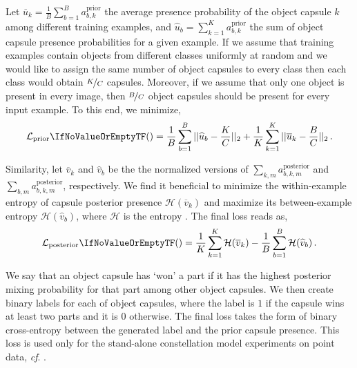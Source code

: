 \begin{description}[leftmargin=\parindent]
\item[Prior sparsity]
    Let $\overline{u}_k = \frac{1}{B} \sum_{b=1}^B a^\mathrm{prior}_{b,k}$ the average presence probability of the object capsule $k$ among different training examples, and $\widehat{u}_b = \sum_{k=1}^K a^\mathrm{prior}_{b,k}$ the sum of object capsule presence probabilities for a given example.
    If we assume that training examples contain objects from different classes uniformly at random and we would like to assign the same number of object capsules to every class then each class would obtain $\nicefrac{K}{C}$ capsules.
    Moreover, if we assume that only one object is present in every image, then $\nicefrac{B}{C}$ object capsules should be present for every input example.
    To this end, we minimize,
    \vspace*{-1.25em}
    \begin{equation}
        \loss[\mathrm{prior}]{} = 
        \frac{1}{B} \sum_{b=1}^B ||\widehat{u}_b  - \frac{K}{C} ||_2
        +
         \frac{1}{K} \sum_{k=1}^K || \overline{u}_k  - \frac{B}{C} ||_2\,. \label{eq:prior_sparsity}
    \end{equation}
\item[Posterior Sparsity]
    Similarity, let $\overline{v}_k$ and $\widehat{v}_b$ be the the normalized versions of  $\sum_{k,m} a^\mathrm{posterior}_{b,k,m}$
    and $\sum_{b,m} a^\mathrm{posterior}_{b,k,m}$, respectively.
    We find it beneficial to minimize the within-example entropy of capsule posterior presence $\mathcal{H}(\overline{v}_k)$ and maximize its between-example entropy $\mathcal{H}(\widehat{v}_b)$, where $\mathcal{H}$ is the entropy . The final loss reads as,
    \vspace*{-1.25em}
    \begin{equation}
        \loss[\mathrm{posterior}]{} = \frac{1}{K} \sum_{k=1}^K \mathcal{H}(\overline{v}_k) - \frac{1}{B} \sum_{b=1}^B \mathcal{H}(\widehat{v}_b)\,. \label{eq:posterior_sparsity}
    \end{equation}
% 
\item[Every active object capsule should explain at least two parts]
    We say that an object capsule has `won' a part if it has the highest posterior mixing probability for that part among other object capsules.
    We then create binary labels for each of object capsules, where the label is $1$ if the capsule wins at least two parts and it is $0$ otherwise.
    The final loss takes the form of binary cross-entropy between the generated label and the prior capsule presence. This loss is used only for the stand-alone constellation model experiments on point data, \textit{cf}. .
% 
\end{description}
